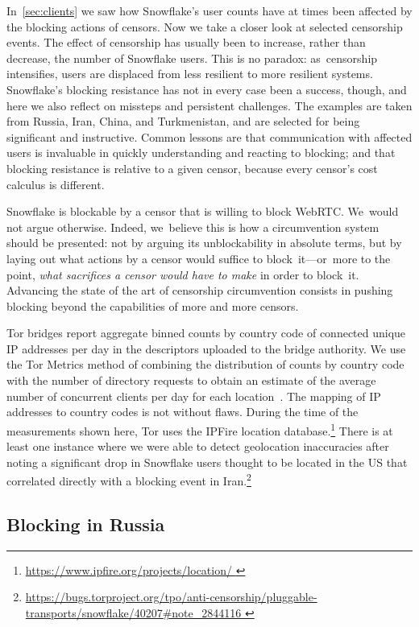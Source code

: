 \documentclass[letterpaper,twocolumn]{article}
\newlength{\urlfootnotesize}
\newcommand{\urlfootnote}[1]{\footnote{
\raggedright\fontsize{\urlfootnotesize}{\urlfootnotesize}\selectfont\url{#1}
}}
\begin{document}
In~\autoref{sec:clients} we saw how Snowflake's user counts
have at times been affected by the blocking actions of censors.
Now we take a closer look at selected censorship events.
The effect of censorship has usually been to increase, rather than decrease,
the number of Snowflake users.
This is no paradox:
as~censorship intensifies,
users are displaced from less resilient
to more resilient systems.
Snowflake's blocking resistance has not in every case been a success,
though, and here we also reflect on missteps
and persistent challenges.
The examples are taken from
Russia, Iran, China, and Turkmenistan,
and are selected for being significant and instructive.
Common lessons are that communication
with affected users is invaluable in quickly understanding and reacting to blocking;
and that blocking resistance is relative to a given censor,
because every censor's cost calculus is different.

Snowflake is blockable by a censor that is willing to block WebRTC.
We~would not argue otherwise.
Indeed, we~believe this is how a circumvention system
should be presented:
not by arguing its unblockability in absolute terms,
but by laying out
what actions by a censor would suffice to block~it---or~more
to the point,
\emph{what sacrifices a censor would have to make}
in order to block~it.
Advancing the state of the art of censorship circumvention
consists in pushing blocking
beyond the capabilities of more and more censors.

Tor bridges report aggregate binned counts by country code of connected unique IP addresses per day in the
descriptors uploaded to the bridge authority. We use the Tor Metrics method of
combining the distribution of counts by country code with the number of directory requests to obtain
an estimate of the average number of concurrent clients per day for each location~\cite{tor-tr-2012-10-001}. The mapping of IP
addresses to country codes is not without flaws. During the time of the measurements shown here, Tor uses
the IPFire location database.\urlfootnote{
https://www.ipfire.org/projects/location/
}
There is at least one instance where we were able to detect geolocation inaccuracies after noting
a significant drop in Snowflake users thought to be located in the US that correlated directly with
a blocking event in Iran.\urlfootnote{
https://bugs.torproject.org/tpo/anti-censorship/pluggable-transports/snowflake/40207\#note_2844116
}

\subsection{Blocking in Russia}
\label{sec:block-ru}
\end{document}
